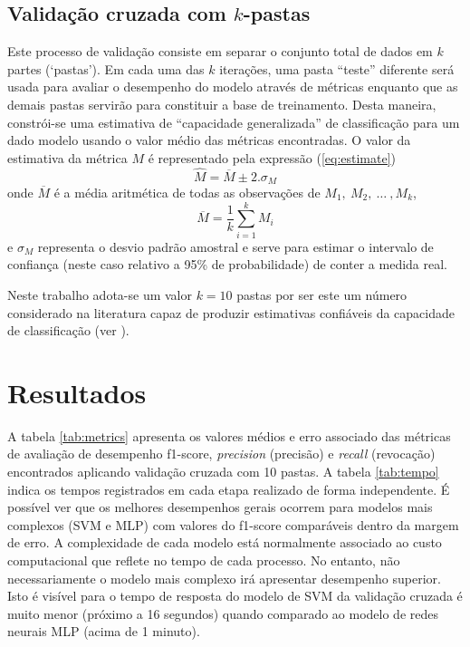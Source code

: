\documentclass[a4paper,11pt]{article}
\begin{document}
\subsection{Validação cruzada com $k$-pastas}

Este processo de validação consiste em separar o conjunto total de dados em $k$ partes (`pastas'). 
Em cada uma das $k$ iterações, uma pasta ``teste'' diferente será usada para avaliar o desempenho 
do modelo através de métricas enquanto que as demais pastas servirão para constituir a base de 
treinamento. Desta maneira, constrói-se uma estimativa de ``capacidade generalizada'' de 
classificação para um dado modelo usando o valor médio das métricas encontradas. O valor da 
estimativa da métrica $M$ é representado pela expressão (\ref{eq:estimate})
\begin{equation}
 \widehat{M} = \overline{M} \pm 2 .\sigma_M
 \label{eq:estimate}
\end{equation}
onde $\overline{M}$ é a média aritmética de todas as observações de $M_1,~M_2,~ \dots~,M_k$, 
$$ \overline{M} = \frac{1}{k}\sum_{i=1}^k M_i$$
e $\sigma_M$ representa o desvio padrão amostral e serve para estimar o intervalo de confiança 
(neste caso relativo a 95\% de probabilidade) de conter a medida real.

Neste trabalho adota-se um valor $k=10$ pastas por ser este um número considerado na literatura 
capaz de produzir estimativas confiáveis da capacidade de classificação (ver \citet{crossval}).






\section{Resultados}


A tabela \ref{tab:metrics} apresenta os valores médios e erro associado das métricas de avaliação 
de desempenho f1-score, \textit{precision} (precisão) e \textit{recall} (revocação) encontrados 
aplicando validação cruzada com 10 pastas. A tabela \ref{tab:tempo} indica os tempos registrados 
em cada etapa realizado de forma independente. É possível ver que os melhores desempenhos gerais 
ocorrem para modelos mais complexos (SVM e MLP) com valores do f1-score comparáveis dentro da 
margem de erro. A complexidade de cada modelo está normalmente associado ao custo computacional 
que reflete no tempo de cada processo. No entanto, não necessariamente o modelo mais complexo irá 
apresentar desempenho superior. Isto é visível para o tempo de resposta do modelo de SVM 
da validação cruzada é muito menor (próximo a 16 segundos) quando comparado ao modelo de redes 
neurais MLP (acima de 1 minuto).
\end{document}
